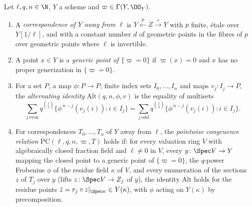 \begin{definition}\label{pf:ks2:def:ptid}
Let $\ell,q,n\in\N$, $Y$ a scheme and $\varpi\in\Gamma(Y,\OO_Y)$.
\begin{enumerate}
\item A \emph{correspondence of $Y$ away from $\ell$}
  is $Y\xleftarrow{p}Z\xrightarrow{r}Y$ with $p$ finite, \'etale over $Y[1/\ell]$, and with a
  constant number $d$ of geometric points in the fibres of $p$ over geometric points where
  $\ell$ is invertible.
\item A point $x\in Y$ is a \emph{generic point of $\{\varpi=0\}$} if $\varpi(x)=0$ and $x$ has no proper
  generization in $\{\varpi=0\}$.
\item For a set $P$, a map $\phi\colon P\to P$, finite index sets $I_0,\dots,I_n$ and maps
  $v_j\colon I_j\to P$, the \emph{alternating identity} $\mathrm{Alt}(q,n,\phi,v)$ is the equality of multisets
  \begin{equation}\label{pf:ks2:eq:altid}
  \sum_{j\ \mathrm{even}}q^{\binom j2}\bigl\{\phi^{\,n-j}(v_j(i)):i\in I_j\bigr\}
  =\sum_{j\ \mathrm{odd}}q^{\binom j2}\bigl\{\phi^{\,n-j}(v_j(i)):i\in I_j\bigr\}.
  \end{equation}
\item For correspondences $T_0,\dots,T_n$ of $Y$ away from $\ell$, the \emph{pointwise congruence
  relation} $\mathrm{PC}(\ell,q,n,\varpi,T)$ holds if: for every valuation ring $V$ with
  algebraically closed fraction field and $\ell\ne0$ in $V$, every $y\colon\Spec V\to Y$ mapping
  the closed point to a generic point of $\{\varpi=0\}$, the $q$-power Frobenius $\phi$ of the
  residue field $\kappa$ of $V$, and every enumeration of the sections $z$ of $T_j$ over $y$
  (lifts $z\colon\Spec V\to Z_j$ of $y$), the identity $\mathrm{Alt}$ holds for the residue
  points $\bar z=r_j\circ z|_{\Spec\kappa}\in Y(\kappa)$, with $\phi$ acting on $Y(\kappa)$ by
  precomposition.
\end{enumerate}
\end{definition}

